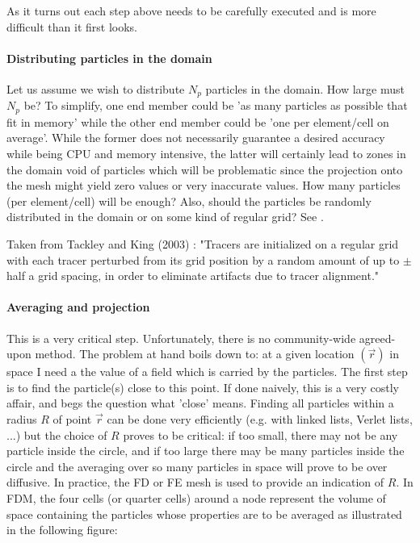 As it turns out each step above needs to be carefully executed and is more difficult 
than it first looks. 

\paragraph{Distributing particles in the domain} 
Let us assume we wish to distribute $N_p$ particles
in the domain. How large must $N_p$ be? To simplify, one end member could be 'as many particles as possible that fit in memory' 
while the other end member could be 'one per element/cell on average'. While the former does not necessarily guarantee a 
desired accuracy while being CPU and memory intensive, the latter will certainly lead to zones in the domain void 
of particles which will be problematic since the projection onto the mesh might yield zero values or very inaccurate values.
How many particles (per element/cell) will be enough?
Also, should the particles be randomly distributed in the domain or on some kind of regular grid? 
See .

Taken from Tackley and King (2003) \cite{taki03}: "Tracers are initialized on a regular grid 
with each tracer perturbed from its grid position by a random amount of up to
$\pm$ half a grid spacing, in order to eliminate artifacts due to tracer alignment."


\paragraph{Averaging and projection} 
This is a very critical step. Unfortunately, there is no community-wide
agreed-upon method. The problem at hand boils down to: at a given location $(\vec r)$ in space I need a
the value of a field which is carried by the particles. 
The first step is to find the particle(s) close to this point. If done naively, this is a very costly affair, 
and begs the question what 'close' means. Finding all particles within a radius $R$ of point $\vec r$ can 
be done very efficiently (e.g. with linked lists, Verlet lists, ...) but the choice 
of $R$ proves to be critical:
if too small, there may not be any particle inside the circle, and if too large there may be many particles 
inside the circle and the averaging over so many particles in space will prove to be over diffusive. 
In practice, the FD or FE mesh is used to provide an indication of $R$. 
In FDM, the four cells (or quarter cells) around
a node represent the volume of space containing the particles whose properties are to be averaged \cite{dumg11} 
as illustrated in the following figure:

